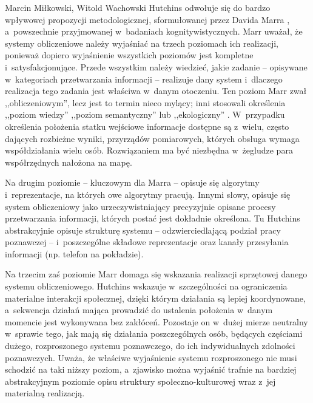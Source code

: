 \begin{artplenv2auth}{Marcin Miłkowski, Witold Wachowski}
Hutchins odwołuje się do bardzo wpływowej propozycji metodologicznej, sformułowanej przez Davida Marra
\parencite*[][]{marr_vision_1982}, %
 a~powszechnie przyjmowanej w~badaniach kognitywistycznych. Marr uważał, że systemy obliczeniowe należy wyjaśniać na trzech poziomach ich realizacji, ponieważ dopiero wyjaśnienie wszystkich poziomów jest kompletne i~satysfakcjonujące. Przede wszystkim należy wiedzieć, jakie zadanie -- opisywane w~kategoriach przetwarzania informacji -- realizuje dany system i~dlaczego realizacja tego zadania jest właściwa w~danym otoczeniu. Ten poziom Marr zwał ,,obliczeniowym'', lecz jest to termin nieco mylący; inni stosowali określenia ,,poziom wiedzy'' 
\parencite[][]{newell_knowledge_1981} %
 ,,poziom semantyczny'' 
\parencite[][]{pylyshyn_computation_1984} %
 lub ,,ekologiczny'' 
\parencite[][]{sterelny_representational_1990}. %
 W~przypadku określenia położenia statku wejściowe informacje dostępne są z~wielu, często dających rozbieżne wyniki, przyrządów pomiarowych, których obsługa wymaga współdziałania wielu osób. Rozwiązaniem ma być niezbędna w~żegludze para współrzędnych nałożona na mapę.

Na drugim poziomie -- kluczowym dla Marra -- opisuje się algorytmy i~reprezentacje, na których owe algorytmy pracują. Innymi słowy, opisuje się system obliczeniowy jako urzeczywistniający precyzyjnie opisane procesy przetwarzania informacji, których postać jest dokładnie określona. Tu Hutchins abstrakcyjnie opisuje strukturę systemu -- odzwierciedlającą podział pracy poznawczej -- i~poszczególne składowe reprezentacje oraz kanały przesyłania informacji (np. telefon na pokładzie).

Na trzecim zaś poziomie Marr domaga się wskazania realizacji sprzętowej danego systemu obliczeniowego. Hutchins wskazuje w~szczególności na ograniczenia materialne interakcji społecznej, dzięki którym działania są lepiej koordynowane, a~sekwencja działań mająca prowadzić do ustalenia położenia w~danym momencie jest wykonywana bez zakłóceń. Pozostaje on w~dużej mierze neutralny w~sprawie tego, jak mają się działania poszczególnych osób, będących częściami dużego, rozproszonego systemu poznawczego, do ich indywidualnych zdolności poznawczych. Uważa, że właściwe wyjaśnienie systemu rozproszonego nie musi schodzić na taki niższy poziom, a~zjawisko można wyjaśnić trafnie na bardziej abstrakcyjnym poziomie opisu struktury społeczno-kulturowej wraz z~jej materialną realizacją.


\end{artplenv2auth}
